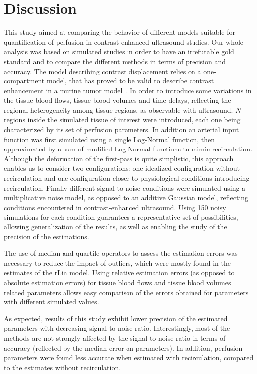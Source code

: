 \section{Discussion}
This study aimed at comparing the behavior of different models suitable for quantification of perfusion in contrast-enhanced ultrasound studies. Our whole analysis was based on simulated studies in order to have an irrefutable gold standard and to compare the different methods in terms of precision and accuracy. The model describing contrast displacement relies on a one-compartment model, that has proved to be valid to describe contrast enhancement in a murine tumor model~\cite{Doury2017wn}. In order to introduce some variations in the tissue blood flows, tissue blood volumes and time-delays, reflecting the regional heterogeneity among tissue regions, as observable with ultrasound. $N$ regions inside the simulated tissue of interest were introduced, each one being characterized by its set of perfusion parameters. In addition an arterial input function was first simulated using a single Log-Normal function, then approximated by a sum of modified Log-Normal functions to mimic recirculation. Although the deformation of the first-pass is quite simplistic, this approach enables us to consider two configurations: one idealized configuration without recirculation and one configuration closer to physiological conditions introducing recirculation. Finally different signal to noise conditions were simulated using a multiplicative noise model, as opposed to an additive Gaussian model, reflecting conditions encountered in contrast-enhanced ultrasound. Using 150 noisy simulations for each condition guarantees a representative set of possibilities, allowing generalization of the results, as well as enabling the study of the precision of the estimations.

The use of median and quartile operators to assess the estimation errors was necessary to reduce the impact of outliers, which were mostly found in the estimates of the rLin model. Using relative estimation errors (as opposed to absolute estimation errors) for tissue blood flows and tissue blood volumes related parameters allows easy comparison of the errors obtained for parameters with different simulated values. 

As expected, results of this study exhibit lower precision of the estimated parameters with decreasing signal to noise ratio. Interestingly, most of the methods are not strongly affected by the signal to noise ratio in terms of accuracy (reflected by the median error on parameters). In addition, perfusion parameters were found less accurate when estimated with recirculation, compared to the estimates without recirculation. 

